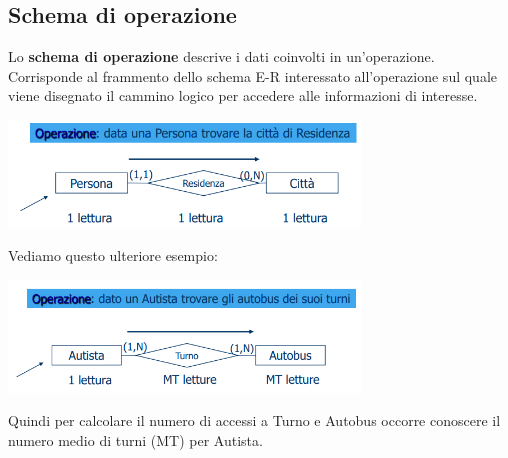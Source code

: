 \documentclass[12pt]{article}
\begin{document}
\subsection{Schema di operazione}
Lo \textbf{schema di operazione} descrive i dati coinvolti in un'operazione.
Corrisponde al frammento dello schema E-R interessato all'operazione sul quale viene disegnato il cammino logico per accedere alle informazioni di interesse.
\begin{center}
    \includegraphics[width = 0.70\textwidth]{Images/90.PNG}
\end{center}
Vediamo questo ulteriore esempio:
\begin{center}
    \includegraphics[width = 0.70\textwidth]{Images/91.PNG}
\end{center}
Quindi per calcolare il numero di accessi a Turno e Autobus occorre conoscere il numero medio di turni (MT) per Autista.
\end{document}
